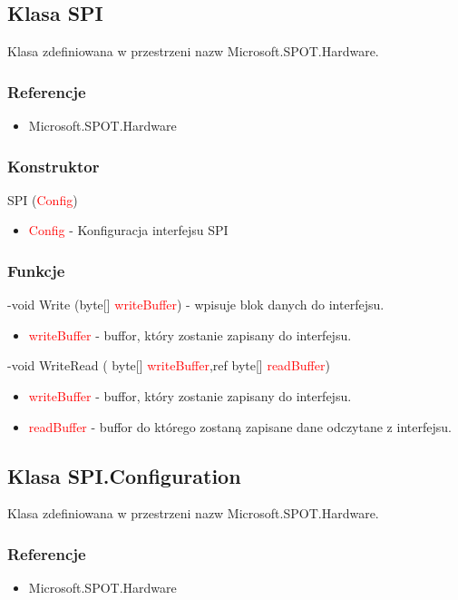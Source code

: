 \documentclass{article}
\begin{document}
\subsection{Klasa SPI}
Klasa zdefiniowana w przestrzeni nazw Microsoft.SPOT.Hardware. 
\subsubsection{Referencje}
\begin{itemize}
\item Microsoft.SPOT.Hardware
\end{itemize}
\subsubsection{Konstruktor}
SPI (\textcolor{red}{Config})
\begin{itemize}
\item \textcolor{red}{Config} - Konfiguracja interfejsu SPI
\end{itemize}
\subsubsection{Funkcje}
-void Write (byte[] \textcolor{red}{writeBuffer}) - wpisuje blok danych do interfejsu.
\begin{itemize}
\item \textcolor{red}{writeBuffer} - buffor, który zostanie zapisany do interfejsu.
\end{itemize}
-void WriteRead ( byte[] \textcolor{red}{writeBuffer},ref byte[] \textcolor{red}{readBuffer})
\begin{itemize}
\item \textcolor{red}{writeBuffer} - buffor, który zostanie zapisany do interfejsu.
\item \textcolor{red}{readBuffer} - buffor do którego zostaną zapisane dane odczytane z \newline interfejsu.
\end{itemize}

\newpage
\subsection{Klasa SPI.Configuration}
Klasa zdefiniowana w przestrzeni nazw Microsoft.SPOT.Hardware. 
\subsubsection{Referencje}
\begin{itemize}
\item Microsoft.SPOT.Hardware
\end{itemize}
\end{document}
